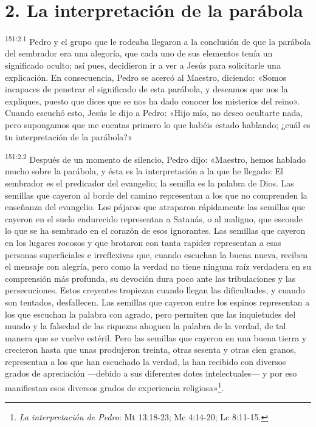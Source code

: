 \section*{2. La interpretación de la parábola}
\par
\textsuperscript{151:2.1} Pedro y el grupo que le rodeaba llegaron a la conclusión de que la parábola del sembrador era una alegoría, que cada uno de sus elementos tenía un significado oculto; así pues, decidieron ir a ver a Jesús para solicitarle una explicación. En consecuencia, Pedro se acercó al Maestro, diciendo: «Somos incapaces de penetrar el significado de esta parábola, y deseamos que nos la expliques, puesto que dices que se nos ha dado conocer los misterios del reino». Cuando escuchó esto, Jesús le dijo a Pedro: «Hijo mío, no deseo ocultarte nada, pero supongamos que me cuentas primero lo que habéis estado hablando; ¿cuál es tu interpretación de la parábola?»

\par
\textsuperscript{151:2.2} Después de un momento de silencio, Pedro dijo: «Maestro, hemos hablado mucho sobre la parábola, y ésta es la interpretación a la que he llegado: El sembrador es el predicador del evangelio; la semilla es la palabra de Dios. Las semillas que cayeron al borde del camino representan a los que no comprenden la enseñanza del evangelio. Los pájaros que atraparon rápidamente las semillas que cayeron en el suelo endurecido representan a Satanás, o al maligno, que esconde lo que se ha sembrado en el corazón de esos ignorantes. Las semillas que cayeron en los lugares rocosos y que brotaron con tanta rapidez representan a esas personas superficiales e irreflexivas que, cuando escuchan la buena nueva, reciben el mensaje con alegría, pero como la verdad no tiene ninguna raíz verdadera en su comprensión más profunda, su devoción dura poco ante las tribulaciones y las persecuciones. Estos creyentes tropiezan cuando llegan las dificultades, y cuando son tentados, desfallecen. Las semillas que cayeron entre los espinos representan a los que escuchan la palabra con agrado, pero permiten que las inquietudes del mundo y la falsedad de las riquezas ahoguen la palabra de la verdad, de tal manera que se vuelve estéril. Pero las semillas que cayeron en una buena tierra y crecieron hasta que unas produjeron treinta, otras sesenta y otras cien granos, representan a los que han escuchado la verdad, la han recibido con diversos grados de apreciación ---debido a sus diferentes dotes intelectuales--- y por eso manifiestan esos diversos grados de experiencia religiosa»\footnote{\textit{La interpretación de Pedro}: Mt 13:18-23; Mc 4:14-20; Lc 8:11-15.}.

